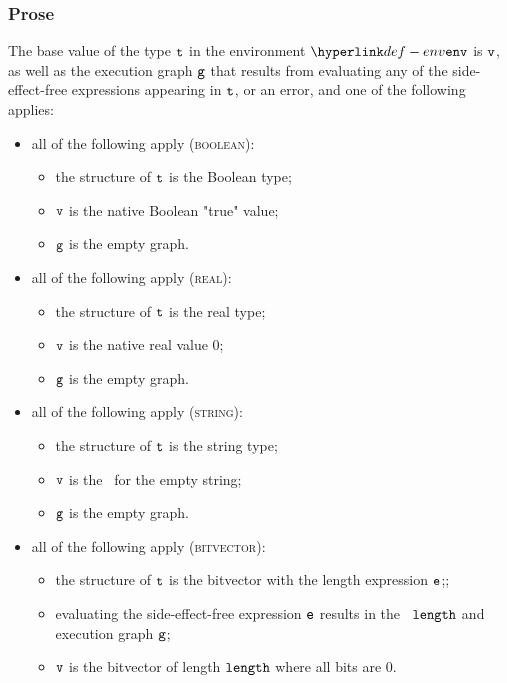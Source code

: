 \subsubsection{Prose}
The base value of the type $\texttt{t}$ in the environment $\env$ is $\texttt{v}$,
as well as the execution graph $\texttt{g}$ that results
from evaluating any of the side-effect-free expressions appearing in $\texttt{t}$,
or an error, and one of the following applies:
\begin{itemize}
  \item all of the following apply (\textsc{boolean}):
  \begin{itemize}
    \item the structure of $\texttt{t}$ is the Boolean type;
    \item $\texttt{v}$ is the native Boolean "true" value;
    \item $\texttt{g}$ is the empty graph.
  \end{itemize}

  \item all of the following apply (\textsc{real}):
  \begin{itemize}
    \item the structure of $\texttt{t}$ is the real type;
    \item $\texttt{v}$ is the native real value $0$;
    \item $\texttt{g}$ is the empty graph.
  \end{itemize}

  \item all of the following apply (\textsc{string}):
  \begin{itemize}
    \item the structure of $\texttt{t}$ is the string type;
    \item $\texttt{v}$ is the \nativevalue\  for the empty string;
    \item $\texttt{g}$ is the empty graph.
  \end{itemize}

  \item all of the following apply (\textsc{bitvector}):
  \begin{itemize}
    \item the structure of $\texttt{t}$ is the bitvector with the length expression $\texttt{e}$;;
    \item evaluating the side-effect-free expression $\texttt{e}$ results in the \nativevalue\  $\texttt{length}$
    and execution graph $\texttt{g}$\ProseOrError;
    \item $\texttt{v}$ is the bitvector of length $\texttt{length}$ where all bits are $0$.
  \end{itemize}


\end{itemize}
